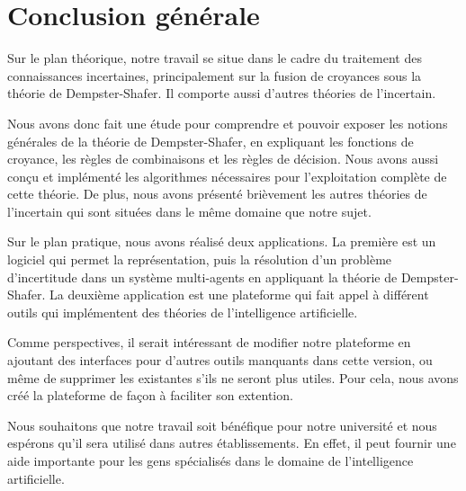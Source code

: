 {}
\chapter*{Conclusion générale}

Sur le plan théorique, notre travail se situe dans le cadre du traitement des connaissances incertaines,
principalement sur la fusion de croyances sous la théorie de Dempster-Shafer. Il comporte aussi d'autres
théories de l'incertain.

Nous avons donc fait une étude pour comprendre et pouvoir exposer les notions générales de la théorie de Dempster-Shafer,
en expliquant les fonctions de croyance, les règles de combinaisons et les règles de décision. 
Nous avons aussi conçu et implémenté les algorithmes nécessaires pour l'exploitation complète de cette théorie. De plus,
nous avons présenté brièvement les autres théories de l'incertain qui sont situées dans le même domaine que notre sujet.

Sur le plan pratique, nous avons réalisé deux applications. La première est un logiciel qui permet la représentation,
puis la résolution d'un problème d'incertitude dans un système multi-agents en appliquant la théorie de Dempster-Shafer.
La deuxième application est une plateforme qui fait appel à différent outils qui implémentent des théories de
l'intelligence artificielle.

Comme perspectives, il serait intéressant de modifier notre plateforme en ajoutant des interfaces pour d'autres outils
manquants dans cette version, ou même de supprimer les existantes s'ils ne seront plus utiles. Pour cela, nous avons créé
la plateforme de façon à faciliter son extention.

Nous souhaitons que notre travail soit bénéfique pour notre université et nous espérons qu'il sera utilisé dans autres
établissements. En effet, il peut fournir une aide importante pour les gens spécialisés dans le domaine de l'intelligence artificielle.